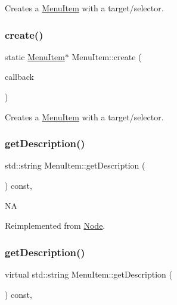 Creates a \hyperlink{classMenuItem}{Menu\+Item} with a target/selector. \mbox{\label{classMenuItem_a4ca5b194b8fc96a60ae7f3bb29c22a4c}} 
\subsubsection{\texorpdfstring{create()}{create()}\hspace{0.1cm}{\footnotesize\ttfamily [6/6]}}
{\footnotesize\ttfamily static \hyperlink{classMenuItem}{Menu\+Item}$\ast$ Menu\+Item\+::create (\begin{DoxyParamCaption}\item[{const cc\+Menu\+Callback \&}]{callback }\end{DoxyParamCaption})\hspace{0.3cm}{\ttfamily [static]}}

Creates a \hyperlink{classMenuItem}{Menu\+Item} with a target/selector. \mbox{\label{classMenuItem_a47f8424575b4f223520d236dda34c3db}} 
\subsubsection{\texorpdfstring{get\+Description()}{getDescription()}\hspace{0.1cm}{\footnotesize\ttfamily [1/2]}}
{\footnotesize\ttfamily std\+::string Menu\+Item\+::get\+Description (\begin{DoxyParamCaption}{ }\end{DoxyParamCaption}) const\hspace{0.3cm}{\ttfamily [override]}, {\ttfamily [virtual]}}

NA 

Reimplemented from \hyperlink{classNode_a41710375a0d92a4ee54c39fe123b5912}{Node}.

\mbox{\label{classMenuItem_adfbe1ff271fb56adcffc38142c1e7a35}} 
\subsubsection{\texorpdfstring{get\+Description()}{getDescription()}\hspace{0.1cm}{\footnotesize\ttfamily [2/2]}}
{\footnotesize\ttfamily virtual std\+::string Menu\+Item\+::get\+Description (\begin{DoxyParamCaption}{ }\end{DoxyParamCaption}) const\hspace{0.3cm}{\ttfamily [override]}, {\ttfamily [virtual]}}

